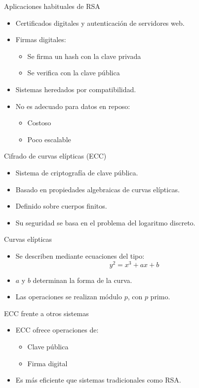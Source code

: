 \documentclass{beamer}
\begin{document}
\begin{frame}{Aplicaciones habituales de RSA}
\begin{itemize}
  \item Certificados digitales y autenticación de servidores web.
  \item Firmas digitales:
  \begin{itemize}
    \item Se firma un hash con la clave privada
    \item Se verifica con la clave pública
  \end{itemize}
  \item Sistemas heredados por compatibilidad.
  \item No es adecuado para datos en reposo:
  \begin{itemize}
    \item Costoso
    \item Poco escalable
  \end{itemize}
\end{itemize}
\end{frame}



\begin{frame}{Cifrado de curvas elípticas (ECC)}
\begin{itemize}
  \item Sistema de criptografía de clave pública.
  \item Basado en propiedades algebraicas de curvas elípticas.
  \item Definido sobre cuerpos finitos.
  \item Su seguridad se basa en el problema del logaritmo discreto.
\end{itemize}
\end{frame}

\begin{frame}{Curvas elípticas}
\begin{itemize}
  \item Se describen mediante ecuaciones del tipo:
  \[
    y^2 = x^3 + ax + b
  \]
  \item $a$ y $b$ determinan la forma de la curva.
  \item Las operaciones se realizan módulo $p$, con $p$ primo.
\end{itemize}
\end{frame}

\begin{frame}{ECC frente a otros sistemas}
\begin{itemize}
  \item ECC ofrece operaciones de:
  \begin{itemize}
    \item Clave pública
    \item Firma digital
  \end{itemize}
  \item Es más eficiente que sistemas tradicionales como RSA.
\end{itemize}
\end{frame}
\end{document}
